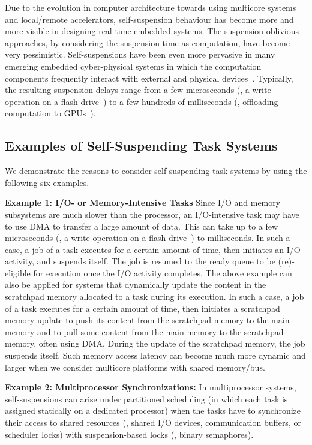 Due to the evolution in computer architecture towards using multicore systems and local/remote accelerators, self-suspension behaviour has become more and more visible in designing real-time embedded systems.  The suspension-oblivious approaches, by considering the suspension time as computation, have become very pessimistic. Self-suspensions have been even more pervasive in many emerging embedded cyber-physical systems in which the computation components frequently interact with external and physical devices~\cite{Kang:rtss07,Kato_2011}.  Typically, the resulting suspension delays range from a few microseconds (\eg, a write operation on a flash drive~\cite{Kang:rtss07}) to a few hundreds of milliseconds (\eg, offloading computation to GPUs~\cite{Kato_2011,Liu_2014}). 

\subsection{Examples of Self-Suspending Task Systems}
\label{sec:examples}

We demonstrate the reasons to consider self-suspending task systems by using the following six examples.

{\bf Example 1: I/O- or Memory-Intensive Tasks} Since I/O and memory subsystems are much slower than the processor, an I/O-intensive task may have to use DMA to transfer a large amount of data. This can take up to a few microseconds (\eg, a write operation on a flash drive~\cite{Kang:rtss07}) to milliseconds. In such a case, a job of a task executes for a certain amount of time, then initiates an I/O activity, and suspends itself. The job is resumed to the ready queue to be (re)-eligible for execution once the I/O activity completes. The above example can also be applied for systems that dynamically update the content in the scratchpad memory allocated to a task during its execution. In such a case, a job of a task executes for a certain amount of time, then initiates a scratchpad memory update to push its content from the scratchpad memory to the main memory and to pull some content from the main memory to the scratchpad memory, often using DMA. During the update of the scratchpad memory, the job suspends itself. Such memory access latency can become much more dynamic and larger when we consider multicore platforms with shared memory/bus.

{\bf Example 2: Multiprocessor Synchronizations:} \hspace{0.1in}
In multiprocessor systems, self-suspensions can arise under partitioned scheduling (in which each task is assigned statically on a dedicated processor) when the tasks have to synchronize their access to shared resources (\eg, shared I/O devices, communication buffers, or scheduler locks) with suspension-based locks (\eg, binary semaphores). 

